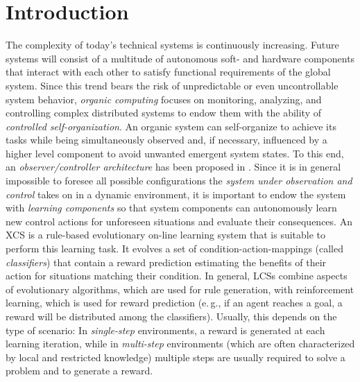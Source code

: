 \section{Introduction}
\label{section:introduction}

The complexity of today's technical systems is continuously increasing. Future systems will consist of a multitude of autonomous soft- and hardware components that interact with each other to satisfy functional requirements of the global system. Since this trend bears the risk of unpredictable or even uncontrollable system behavior, \emph{organic computing} \cite{RMB+06} %
focuses on monitoring, analyzing, and controlling complex distributed systems to endow them with the ability of \emph{controlled self-organization}. An or\-ga\-nic system can self-organize to achieve its tasks while being simultaneously observed and, if necessary, influenced by a higher level component to avoid unwanted emergent system states. To this end, an \emph{observer/controller architecture} has been proposed in \cite{RMB+06}. %
Since it is in general impossible to foresee all possible configurations the \emph{system under observation and control} takes on in a dynamic environment, it is important to endow the system with \emph{learning components} so that system components can autonomously learn new control actions for unforeseen situations and evaluate their consequences. An XCS \cite{Wil95} is a rule-based evolutionary on-line learning system that is suitable to perform this learning task. It evolves a set of condition-action-mappings (called \emph{classifiers}) that contain a reward prediction estimating the benefits of their action for situations matching their condition. 
In general, LCSs combine aspects of evolutionary algorithms, which are used for rule generation, with reinforcement learning, which is used for reward prediction (e.\,g., if an agent reaches a goal, a reward will be distributed among the classifiers). 
Usually, this depends on the type of scenario: In \emph{single-step} environments, a reward is generated at each learning iteration, while in \emph{multi-step} environments (which are often characterized by local and restricted knowledge) 
multiple steps are usually required to solve a problem and to generate a reward.

